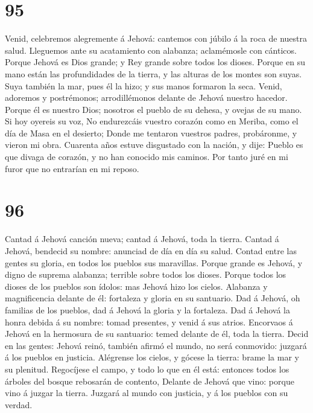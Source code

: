 \hypertarget{section-94}{%
\section{95}\label{section-94}}

 Venid, celebremos alegremente á Jehová: cantemos con
júbilo á la roca de nuestra salud.  Lleguemos ante su
acatamiento con alabanza; aclamémosle con cánticos. 
Porque Jehová es Dios grande; y Rey grande sobre todos los dioses.
 Porque en su mano están las profundidades de la tierra, y
las alturas de los montes son suyas.  Suya también la mar,
pues él la hizo; y sus manos formaron la seca.  Venid,
adoremos y postrémonos; arrodillémonos delante de Jehová nuestro
hacedor.  Porque él es nuestro Dios; nosotros el pueblo de
su dehesa, y ovejas de su mano. Si hoy oyereis su voz,  No
endurezcáis vuestro corazón como en Meriba, como el día de Masa en el
desierto;  Donde me tentaron vuestros padres, probáronme,
y vieron mi obra.  Cuarenta años estuve disgustado con la
nación, y dije: Pueblo es que divaga de corazón, y no han conocido mis
caminos.  Por tanto juré en mi furor que no entrarían en
mi reposo.

\hypertarget{section-95}{%
\section{96}\label{section-95}}

 Cantad á Jehová canción nueva; cantad á Jehová, toda la
tierra.  Cantad á Jehová, bendecid su nombre: anunciad de
día en día su salud.  Contad entre las gentes su gloria,
en todos los pueblos sus maravillas.  Porque grande es
Jehová, y digno de suprema alabanza; terrible sobre todos los dioses.
 Porque todos los dioses de los pueblos son ídolos: mas
Jehová hizo los cielos.  Alabanza y magnificencia delante
de él: fortaleza y gloria en su santuario.  Dad á Jehová,
oh familias de los pueblos, dad á Jehová la gloria y la fortaleza.
 Dad á Jehová la honra debida á su nombre: tomad
presentes, y venid á sus atrios.  Encorvaos á Jehová en la
hermosura de su santuario: temed delante de él, toda la tierra.
 Decid en las gentes: Jehová reinó, también afirmó el
mundo, no será conmovido: juzgará á los pueblos en justicia.
 Alégrense los cielos, y gócese la tierra: brame la mar y
su plenitud.  Regocíjese el campo, y todo lo que en él
está: entonces todos los árboles del bosque rebosarán de contento,
 Delante de Jehová que vino: porque vino á juzgar la
tierra. Juzgará al mundo con justicia, y á los pueblos con su verdad.

